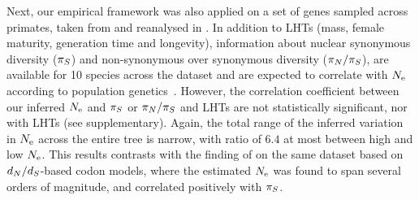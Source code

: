 \documentclass{MBE}
\begin{document}

	Next, our empirical framework was also applied on a set of genes sampled across primates, taken from \citet{Perelman2011} and reanalysed in \citet{Brevet2019}.
	In addition to LHTs (mass, female maturity, generation time and longevity), information about nuclear {synonymous} diversity ($\pi_S$) and {non-synonymous} over {synonymous} diversity ($\pi_N / \pi_S$), are available for 10 species across the dataset and are expected to correlate with $N_{\text{e}}$ according to population genetics~\citep{Eyre-walker2007, Galtier2016}.
	However, the correlation coefficient between our inferred $N_{\text{e}}$ and $\pi_S$ or $\pi_N / \pi_S$ and LHTs are not statistically significant, nor with {LHT}s (see supplementary).
	Again, the total range of the inferred variation in $N_{\text{e}}$ across the entire tree is narrow, with ratio of $6.4$ at most between high and low $N_{\text{e}}$.
	This results contrasts with the finding of \citet{Brevet2019} on the same dataset based on $d_N / d_S$-based {codon} models, where the estimated $N_{\text{e}}$ was found to span several orders of magnitude, and correlated positively with $\pi_S$.
\end{document}
